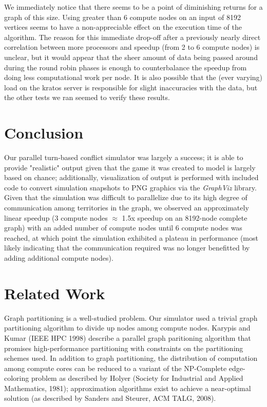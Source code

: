 \documentclass[10pt]{article}
\begin{document}
\begin{multicols}{2}
		We immediately notice that there seems to be a point of diminishing returns for a graph of this size. 
		Using greater than 6 compute nodes on an input of 8192 vertices seems to have a non-appreciable effect on the execution time of the algorithm. The reason for this immediate drop-off after a previously nearly direct correlation between more processors and speedup (from 2 to 6 compute nodes) is unclear, but it would appear that the sheer amount of data being passed around during the round robin phases is enough to counterbalance the speedup from doing less computational work per node. It is also possible that the (ever varying) load on the kratos server is responsible for slight inaccuracies with the data, but the other tests we ran seemed to verify these results.
				
		\section*{Conclusion}
		Our parallel turn-based conflict simulator was largely a success; it is able to provide "realistic" output given that the game it was created to model is largely based on chance; additionally, visualization of output is performed with included code to convert simulation snapshots to PNG graphics via the \emph{GraphViz} library.
		Given that the simulation was difficult to parallelize due to its high degree of communication among territories in the graph, we observed an approximately linear speedup (3 compute nodes $\approx$ 1.5x speedup on an 8192-node complete graph) with an added number of compute nodes until 6 compute nodes was reached, at which point the simulation exhibited a plateau in performance (most likely indicating that the communication required was no longer benefitted by adding additional compute nodes).

		

		\section*{Related Work}
		Graph partitioning is a well-studied problem.  
		Our simulator used a trivial graph partitioning algorithm to divide up nodes among compute nodes.  
		Karypis and Kumar (IEEE HPC 1998) describe a parallel graph paritioning algorithm that promises high-performance partitioning with constraints on the partitioning schemes used.  
		In addition to graph partitioning, the distribution of computation among compute cores can be reduced to a variant of the NP-Complete edge-coloring problem as described by Holyer (Society for Industrial and Applied Mathematics, 1981); approximation algorithms exist to achieve a near-optimal solution (as described by Sanders and Steurer, ACM TALG, 2008).


\end{multicols}
\end{document}
